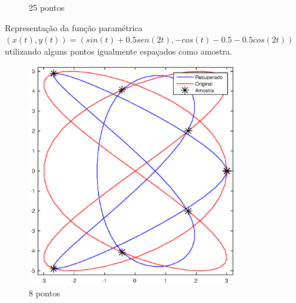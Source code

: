 \begin{figure}[htb]
\begin{subfigure}[b]{0.43\textwidth}
		\caption{25 pontos}
		\label{fig:ex13}
	\end{subfigure}
	\caption{Representação da função paramétrica $(x(t), y(t)) = (sin(t) + 0.5 sen(2t), -cos(t) - 0.5 - 0.5 cos(2t))$ utilizando alguns pontos igualmente espaçados como amostra.}
	\label{fig:ex1rep}
\end{figure}


\begin{figure}[htb]
	\centering
	\begin{subfigure}[b]{0.43\textwidth}
		\centering
		\includegraphics[width=\textwidth]{imagens/cap4/rep_2_8.eps}
		\caption{8 pontos}
		\label{fig:ex21}
	\end{subfigure}
	\hfill
	\begin{subfigure}[b]{0.43\textwidth}
		\centering

\end{subfigure}
\end{figure}
